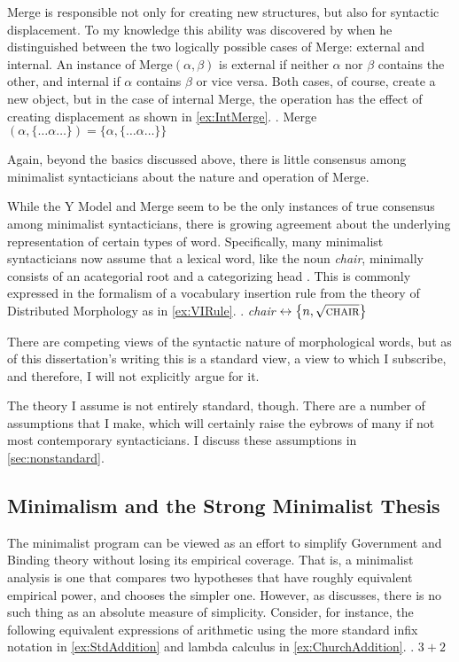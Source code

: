 \documentclass[MilwayThesis]{subfiles}
\begin{document}
Merge is responsible not only for creating new structures, but also for syntactic displacement.
To my knowledge this ability was discovered by \textcite{chomsky2004beyond} when he distinguished between the two logically possible cases of Merge: external and internal.
An instance of Merge$(\alpha, \beta)$ is external if neither $\alpha$ nor $\beta$ contains the other, and internal if $\alpha$ contains $\beta$ or vice versa.
Both cases, of course, create a new object, but in the case of internal Merge, the operation has the effect of creating displacement as shown in \cref{ex:IntMerge}.
\ex.\label{ex:IntMerge} Merge$(\alpha, \{\ldots\alpha\ldots\}) = \{\alpha, \{\ldots\alpha\ldots\}\}$

Again, beyond the basics discussed above, there is little consensus among minimalist syntacticians about the nature and operation of Merge.

While the Y Model and Merge seem to be the only instances of true consensus among minimalist syntacticians, there is growing agreement about the underlying representation of certain types of word.
Specifically, many minimalist syntacticians now assume that a lexical word, like the noun \textit{chair}, minimally consists of an acategorial root and a categorizing head \parencite{borer2005name,marantz1997no}.
This is commonly expressed in the formalism of a vocabulary insertion rule from the theory of Distributed Morphology as in \cref{ex:VIRule}.
\ex.\label{ex:VIRule} \textit{chair} $\leftrightarrow \left\{ n, \sqrt{\textsc{chair}} \right\}$

There are competing views of the syntactic nature of morphological words, but as of this dissertation's writing this is a standard view, a view to which I subscribe, and therefore, I will not explicitly argue for it.

The theory I assume is not entirely standard, though.
There are a number of assumptions that I make, which will certainly raise the eybrows of many if not most contemporary syntacticians.
I discuss these assumptions in \cref{sec:nonstandard}.

\subsection{Minimalism and the Strong Minimalist Thesis}
The minimalist program can be viewed as an effort to simplify Government and Binding theory without losing its empirical coverage.
That is, a minimalist analysis is one that compares two hypotheses that have roughly equivalent empirical power, and chooses the simpler one.
However, as \textcite{chomsky1965aspects} discusses, there is no such thing as an absolute measure of simplicity.
Consider, for instance, the following equivalent expressions of arithmetic using the more standard infix notation in \cref{ex:StdAddition} and lambda calculus in \cref{ex:ChurchAddition}.
\ex.\label{ex:StdAddition} $3 + 2$
\end{document}
